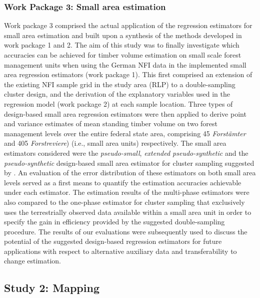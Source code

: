 \subsubsection{Work Package 3: Small area estimation} %


Work package 3 comprised the actual application of the regression estimators for small area estimation and built upon a synthesis of the methods developed in work package 1 and 2. The aim of this study was to finally investigate which accuracies can be achieved for timber volume estimation on small scale forest management units when using the German NFI data in the implemented small area regression estimators (work package 1). This first comprised an extension of the existing NFI sample grid in the study area (RLP) to a double-sampling cluster design, and the derivation of the explanatory variables used in the regression model (work package 2) at each sample location. Three types of design-based small area regression estimators were then applied to derive point and variance estimates of mean standing timber volume on two forest management levels over the entire federal state area, comprising 45 \textit{Forst{\"a}mter} and 405 \textit{Forstreviere}) (i.e., small area units) respectively. The small area estimators considered were the \textit{pseudo-small}, \textit{extended pseudo-synthetic} and the \textit{pseudo-synthetic} design-based small area estimator for cluster sampling suggested by \citet{mandallaz2013a, mandallaz2013b}. An evaluation of the error distribution of these estimators on both small area levels served as a first means to quantify the estimation accuracies achievable under each estimator. The estimation results of the multi-phase estimators were also compared to the one-phase estimator for cluster sampling that exclusively uses the terrestrially observed data available within a small area unit in order to specify the gain in efficiency provided by the suggested double-sampling procedure. The results of our evaluations were subsequently used to discuss the potential of the suggested design-based regression estimators for future applications with respect to alternative auxiliary data and transferability to change estimation.

\subsection{Study 2: Mapping} %
\label{sec:study2}

